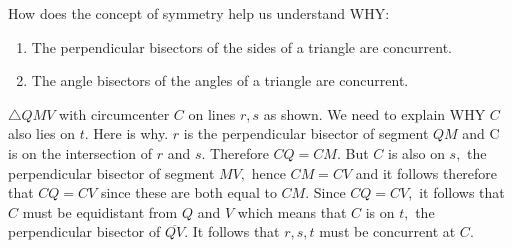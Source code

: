 \documentclass{tufte-handout}
\newcommand{\uv}{\vspace{.1in}}
\begin{document}
\begin{tcolorbox}[enhanced jigsaw,breakable,pad at break*=1mm,
  colback=cyan!2!white,colframe=blue!75!black,title=Student View: Slide 15,drop fuzzy shadow,watermark color=white,watermark text=\arabic{tcbbreakpart}]
  How does the concept of symmetry help us understand WHY:
 \begin{enumerate}
     \item The perpendicular bisectors of the sides of a triangle are concurrent.
     \item The angle bisectors of the angles of a triangle are concurrent.
 \end{enumerate}
 
 \uv {}
 \uv \begin{center}
 \end{center}
  
  \uv {} $\triangle QMV$ with circumcenter $C$ on lines $r, s$ as shown. We need to explain WHY $C$ also lies on $t.$ Here is why. $r$ is the perpendicular bisector of segment $QM$ and C is on the intersection of $r$ and $s$. Therefore $\displaystyle{CQ=CM}.$ But $C$ is also on $s,$ the perpendicular bisector of segment $MV,$ hence $\displaystyle{CM=CV}$ and it follows therefore that $\displaystyle{CQ=CV}$ since these are both equal to $CM.$ Since $CQ=CV,$ it follows that $C$ must be equidistant from $Q$ and $V$ which means that $C$ is on $t,$ the perpendicular bisector of $\overline{QV}$. It follows that $r,s,t$ must be concurrent at $C.$
  
  \pagebreak
  

\end{tcolorbox}
\end{document}
